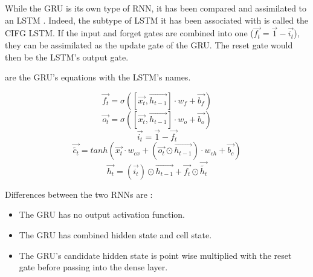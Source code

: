 While the \ac{GRU} is its own type of \ac{RNN}, it has been compared and assimilated to an \ac{LSTM} \cite{nbLSTM}. Indeed, the subtype of \ac{LSTM} it has been associated with is called the \ac{CIFG} \ac{LSTM}. If the input and forget gates are combined into one ($\overrightarrow{f_t}=\overrightarrow{1}-\overrightarrow{i_t}$), they can be assimilated as the update gate of the \ac{GRU}. The reset gate would then be the \ac{LSTM}'s output gate.

 are the \ac{GRU}'s equations with the \ac{LSTM}'s names.

\begin{equation}\label{eq:lstmGru0}
  \overrightarrow{f_t}=\sigma ([\overrightarrow{x_t},\overrightarrow{h_{t-1}}] \cdot w_f + \overrightarrow{b_f})
\end{equation}
\begin{equation}\label{eq:lstmGru1}
  \overrightarrow{o_t}=\sigma ([\overrightarrow{x_t},\overrightarrow{h_{t-1}}] \cdot w_o + \overrightarrow{b_o})
\end{equation}
\begin{equation}\label{eq:lstmGru2}
  \overrightarrow{i_t}=\overrightarrow{1}-\overrightarrow{f_t}
\end{equation}
\begin{equation}\label{eq:lstmGru3}
  \overrightarrow{\tilde{c_t}}=tanh(\overrightarrow{x_t}\cdot w_{cx}+(\overrightarrow{o_t}\odot\overrightarrow{h_{t-1}}) \cdot w_{ch} + \overrightarrow{b_c})
\end{equation}
\begin{equation}\label{eq:lstmGru4}
  \overrightarrow{h_t}=(\overrightarrow{i_t})\odot \overrightarrow{h_{t-1}} + \overrightarrow{f_t}\odot \overrightarrow{\tilde{h_t}}
\end{equation}

Differences between the two \acp{RNN} are :
\begin{itemize}
  \item The \ac{GRU} has no output activation function.
  \item The \ac{GRU} has combined hidden state and cell state.
  \item The \ac{GRU}'s candidate hidden state is point wise multiplied with the reset gate before passing into the dense layer.
\end{itemize}
